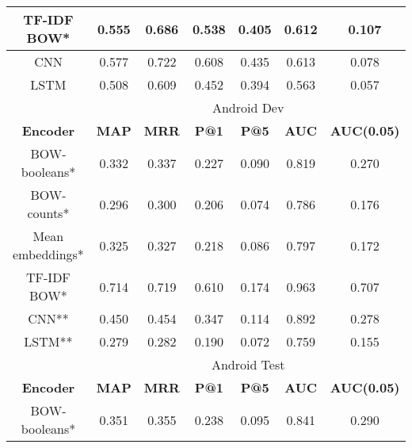 \documentclass[12pt]{article}
\begin{document}
\begin{center}
\begin{tabular}{|c||c|c|c|c||c|c|}
			\cellcolor{red!15}TF-IDF BOW* & 0.555 & 0.686 & 0.538 & 0.405 & 0.612 & 0.107 \\ \hline\hline
			\cellcolor{green!15}CNN & 0.577 & 0.722 & 0.608 & 0.435 & 0.613 & 0.078 \\ \hline
			\cellcolor{green!15}LSTM & 0.508 & 0.609 & 0.452 & 0.394 & 0.563 & 0.057 \\ \hline
			\hline
			\cellcolor{gray!15}
				& \multicolumn{6}{c|}{\cellcolor{gray!15}Android Dev} \\ \hline
			\cellcolor{gray!15}\textbf{Encoder} & \cellcolor{gray!15}\textbf{MAP} & \cellcolor{gray!15}\textbf{MRR}
				& \cellcolor{gray!15}\textbf{P@1} & \cellcolor{gray!15}\textbf{P@5}
				& \cellcolor{gray!15}\textbf{AUC} & \cellcolor{gray!15}\textbf{AUC(0.05)} \\ \hline\hline
			\cellcolor{red!15}BOW-booleans* & 0.332 & 0.337 & 0.227 & 0.090 & 0.819 & 0.270 \\ \hline
			\cellcolor{red!15}BOW-counts* & 0.296 & 0.300 & 0.206 & 0.074 & 0.786 & 0.176 \\ \hline
			\cellcolor{red!15}Mean embeddings* & 0.325 & 0.327 & 0.218 & 0.086 & 0.797 & 0.172 \\ \hline
			\cellcolor{red!15}TF-IDF BOW* & 0.714 & 0.719 & 0.610 & 0.174 & 0.963 & 0.707 \\ \hline\hline
			\cellcolor{green!15}CNN** & 0.450 & 0.454 & 0.347 & 0.114 & 0.892 & 0.278 \\ \hline
			\cellcolor{green!15}LSTM** & 0.279 & 0.282 & 0.190 & 0.072 & 0.759 & 0.155 \\ \hline
			\hline
			\cellcolor{gray!15}
				& \multicolumn{6}{c|}{\cellcolor{gray!15}Android Test} \\ \hline
			\cellcolor{gray!15}\textbf{Encoder} & \cellcolor{gray!15}\textbf{MAP} & \cellcolor{gray!15}\textbf{MRR}
				& \cellcolor{gray!15}\textbf{P@1} & \cellcolor{gray!15}\textbf{P@5}
				& \cellcolor{gray!15}\textbf{AUC} & \cellcolor{gray!15}\textbf{AUC(0.05)} \\ \hline\hline
			\cellcolor{red!15}BOW-booleans* & 0.351 & 0.355 & 0.238 & 0.095 & 0.841 & 0.290 \\ \hline

\end{tabular}
\end{center}
\end{document}
